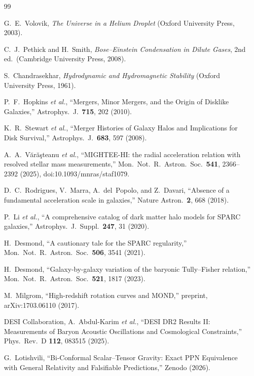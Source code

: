 \documentclass[11pt]{article}
\begin{document}
\begin{thebibliography}{99}

G.~E.~Volovik,
\textit{The Universe in a Helium Droplet}
(Oxford University Press, 2003).

C.~J.~Pethick and H.~Smith,
\textit{Bose--Einstein Condensation in Dilute Gases},
2nd ed.\ (Cambridge University Press, 2008).

S.~Chandrasekhar,
\textit{Hydrodynamic and Hydromagnetic Stability}
(Oxford University Press, 1961).

P.~F.~Hopkins \textit{et al.},
``Mergers, Minor Mergers, and the Origin of Disklike Galaxies,''
Astrophys.\ J.\ \textbf{715}, 202 (2010).

K.~R.~Stewart \textit{et al.},
``Merger Histories of Galaxy Halos and Implications for Disk Survival,''
Astrophys.\ J.\ \textbf{683}, 597 (2008).

A.~A.~V{\u a}r{\u a}{\c s}teanu \textit{et al.},
``MIGHTEE-HI: the radial acceleration relation with resolved stellar mass measurements,''
Mon.\ Not.\ R.\ Astron.\ Soc.\ \textbf{541}, 2366--2392 (2025),
doi:10.1093/mnras/staf1079.

D.~C.~Rodrigues, V.~Marra, A.~del~Popolo, and Z.~Davari,
``Absence of a fundamental acceleration scale in galaxies,''
Nature Astron.\ \textbf{2}, 668 (2018).

P.~Li \textit{et al.},
``A comprehensive catalog of dark matter halo models for SPARC galaxies,''
Astrophys.\ J.\ Suppl.\ \textbf{247}, 31 (2020).

H.~Desmond,
``A cautionary tale for the SPARC regularity,''
Mon.\ Not.\ R.\ Astron.\ Soc.\ \textbf{506}, 3541 (2021).

H.~Desmond,
``Galaxy-by-galaxy variation of the baryonic Tully--Fisher relation,''
Mon.\ Not.\ R.\ Astron.\ Soc.\ \textbf{521}, 1817 (2023).

M.~Milgrom,
``High-redshift rotation curves and MOND,''
preprint, arXiv:1703.06110 (2017).

DESI Collaboration, A.~Abdul-Karim \textit{et al.},
``DESI DR2 Results II: Measurements of Baryon Acoustic
Oscillations and Cosmological Constraints,''
Phys.\ Rev.\ D \textbf{112}, 083515 (2025).

G.~Lotishvili,
``Bi-Conformal Scalar--Tensor Gravity: Exact PPN Equivalence
with General Relativity and Falsifiable Predictions,''
Zenodo (2026).


\end{thebibliography}
\end{document}
